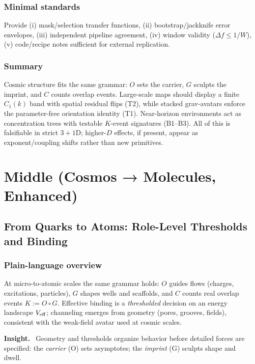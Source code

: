 \documentclass[12pt,a4paper,oneside]{scrreprt}
\newenvironment{insight}{\par\vspace{0.5em}\noindent\textbf{Insight.}\ }{\par\vspace{0.5em}}
\begin{document}
\section{Minimal standards}\label{sec:cosmos-standards}
Provide (i) mask/selection transfer functions, (ii) bootstrap/jackknife error envelopes, (iii) independent pipeline agreement, (iv) window validity ($\Delta f\le 1/W$), (v) code/recipe notes sufficient for external replication.

\section*{Summary}
Cosmic structure fits the same grammar: $O$ sets the carrier, $G$ sculpts the imprint, and $C$ counts overlap events. 
Large-scale maps should display a finite $C_1(k)$ band with spatial residual flips (T2), while stacked grav-avatars enforce the parameter-free orientation identity (T1). 
Near-horizon environments act as concentration trees with testable $K$-event signatures (B1–B3). 
All of this is falsifiable in strict $3{+}1$D; higher-$D$ effects, if present, appear as exponent/coupling shifts rather than new primitives.

\part{Middle (Cosmos → Molecules, Enhanced)}

\chapter{From Quarks to Atoms: Role-Level Thresholds and Binding}\label{ch:micro-binding}

\section*{Plain-language overview}
At micro-to-atomic scales the same grammar holds: $O$ guides flows (charges, excitations, particles), $G$ shapes wells and scaffolds, and $C$ counts real overlap events $K:=O\!\circ G$. Effective binding is a \emph{thresholded} decision on an energy landscape $V_{\rm eff}$; channeling emerges from geometry (pores, grooves, fields), consistent with the weak-field avatar used at cosmic scales.

\begin{insight}
Geometry and thresholds organize behavior before detailed forces are specified: the \emph{carrier} (O) sets asymptotes; the \emph{imprint} (G) sculpts shape and dwell.
\end{insight}
\end{document}
